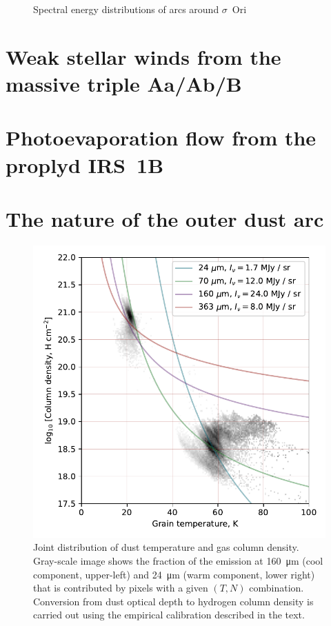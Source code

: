 \documentclass[useAMS, usenatbib, a4paper]{mnras}
\begin{document}
\begin{figure}
  \centering
  \caption{Spectral energy distributions of arcs around $\sigma$~Ori}
  \label{fig:sig-ori-SED}
\end{figure}



\section{Weak stellar winds from the massive triple Aa/Ab/B}
\label{sec:stellar-winds-AB}

\section{Photoevaporation flow from the proplyd IRS~1B}
\label{sec:phot-flow-from}

\section{The nature of the outer dust arc}

\begin{figure}
  \includegraphics[width=\linewidth]{figs/sigma-ori-N-T-histogram}
  \caption{Joint distribution of dust temperature and gas column
    density. Gray-scale image shows the fraction of the emission at
    \SI{160}{\um} (cool component, upper-left) and \SI{24}{\um} (warm
    component, lower right) that is contributed by pixels with a given
    \((T, N)\) combination. Conversion from dust optical depth to
    hydrogen column density is carried out using the empirical
    calibration described in the text.}
  \label{fig:N-T-distro}
\end{figure}
\end{document}
